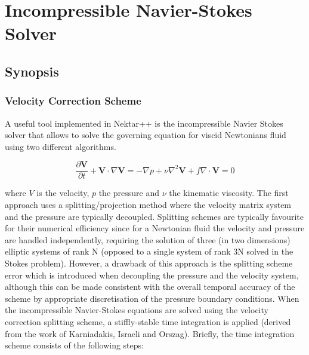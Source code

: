 \chapter{Incompressible Navier-Stokes Solver}
\label{IncNSsolver}

\section{Synopsis}
\subsection{Velocity Correction Scheme}
\label{VCSscheme}
A useful tool implemented in Nektar++ is the incompressible Navier Stokes solver that allows to solve the governing equation for viscid Newtonians fluid using two different algorithms. 

\begin{subequations}
\begin{equation}
   \frac{\partial \mathbf{V}}{\partial t} + \mathbf{V} \cdot \nabla \mathbf{V} = -\nabla p + \nu \nabla^2 \mathbf{V} + f
 \end{equation}
 
 \begin{equation}
    \nabla \cdot \mathbf{V} = 0
    \end{equation}
 \end{subequations}
 
where $V$ is the velocity, $p$ the pressure and $\nu$ the kinematic viscosity. The first approach uses a splitting/projection method where the velocity matrix system and the pressure are typically decoupled. Splitting schemes are typically favourite for their numerical efficiency since for a Newtonian fluid the velocity and pressure are handled independently, requiring the solution of three (in two dimensions) elliptic systems of rank N (opposed to a single system of rank 3N solved in the Stokes problem). However, a drawback of this approach is the splitting scheme error which is introduced when decoupling the pressure and the velocity system, although this can be made consistent with the overall temporal accuracy of the scheme by appropriate discretisation of the pressure boundary conditions. When the incompressible Navier-Stokes equations are solved using the velocity correction splitting scheme, a stiffly-stable time integration is applied (derived from the work of Karniadakis, Israeli and Orszag).
 Briefly, the time integration scheme consists of the following steps:\\
 

